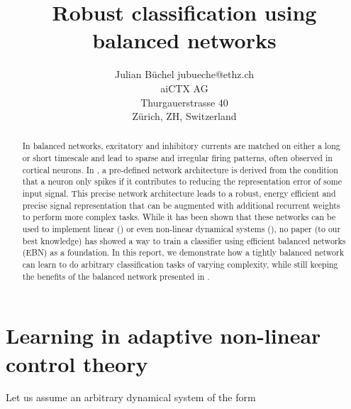 \documentclass[twoside,11pt,titlepage]{article}
\begin{document}
\title{Robust classification using balanced networks}

\author{\name Julian B\"uchel \email jubueche@ethz.ch \\
       \addr aiCTX AG\\
       Thurgauerstrasse 40 \\
       Z\"urich, ZH, Switzerland}


\maketitle

\newpage
\phantom{.}
\newpage

\tableofcontents
\newpage

\begin{abstract}%
  In balanced networks, excitatory and inhibitory currents are matched on either a long or short timescale and
  lead to sparse and irregular firing patterns, often observed in cortical neurons. In \cite{Bourdoukan:2012:LOS:2999325.2999390},
  a pre-defined network architecture is derived from the condition that a neuron only spikes if it contributes to reducing the
  representation error of some input signal. This precise network architecture leads to a robust, energy efficient and precise signal
  representation that can be augmented with additional recurrent weights to perform more complex tasks. \newline
  While it has been shown that these networks can be used to implement linear (\cite{boerlin}) or even non-linear dynamical systems (\cite{alemi2017learning}),
  no paper (to our best knowledge) has showed a way to train a classifier using efficient balanced networks (EBN) as a foundation. \newline
  In this report, we demonstrate how a tightly balanced network can learn to do arbitrary classification tasks of varying complexity, while still keeping 
  the benefits of the balanced network presented in \cite{Bourdoukan:2012:LOS:2999325.2999390}.
   
\end{abstract}

\newpage

\section{Learning in adaptive non-linear control theory} \label{sec:learning_adap}
Let us assume an arbitrary dynamical system of the form
\end{document}
